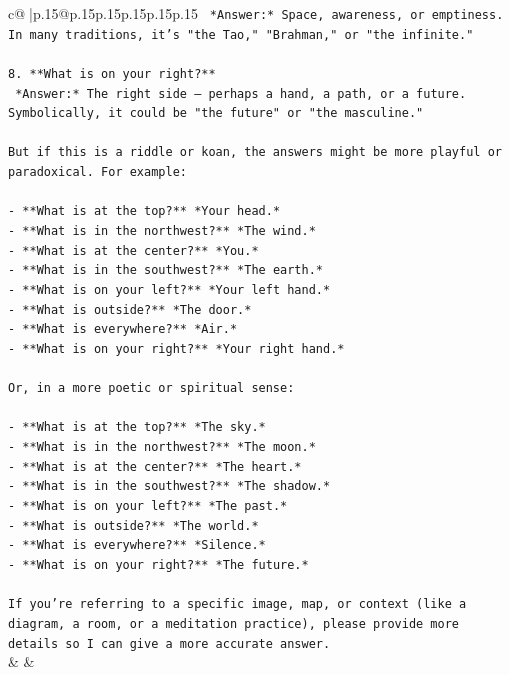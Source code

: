 \documentclass{article}
\begin{document}
{\begin{supertabular}{c@{$\;$}|p{.15\linewidth}@{}p{.15\linewidth}p{.15\linewidth}p{.15\linewidth}p{.15\linewidth}p{.15\linewidth}}
{{{\texttt{   *Answer:* Space, awareness, or emptiness. In many traditions, it's "the Tao," "Brahman," or "the infinite."} \\
\\ 
\texttt{8. **What is on your right?**  } \\
\texttt{   *Answer:* The right side — perhaps a hand, a path, or a future. Symbolically, it could be "the future" or "the masculine."} \\
\\ 
\texttt{But if this is a riddle or koan, the answers might be more playful or paradoxical. For example:} \\
\\ 
\texttt{{-} **What is at the top?** *Your head.*  } \\
\texttt{{-} **What is in the northwest?** *The wind.*  } \\
\texttt{{-} **What is at the center?** *You.*  } \\
\texttt{{-} **What is in the southwest?** *The earth.*  } \\
\texttt{{-} **What is on your left?** *Your left hand.*  } \\
\texttt{{-} **What is outside?** *The door.*  } \\
\texttt{{-} **What is everywhere?** *Air.*  } \\
\texttt{{-} **What is on your right?** *Your right hand.*} \\
\\ 
\texttt{Or, in a more poetic or spiritual sense:} \\
\\ 
\texttt{{-} **What is at the top?** *The sky.*  } \\
\texttt{{-} **What is in the northwest?** *The moon.*  } \\
\texttt{{-} **What is at the center?** *The heart.*  } \\
\texttt{{-} **What is in the southwest?** *The shadow.*  } \\
\texttt{{-} **What is on your left?** *The past.*  } \\
\texttt{{-} **What is outside?** *The world.*  } \\
\texttt{{-} **What is everywhere?** *Silence.*  } \\
\texttt{{-} **What is on your right?** *The future.*} \\
\\ 
\texttt{If you're referring to a specific image, map, or context (like a diagram, a room, or a meditation practice), please provide more details so I can give a more accurate answer.} \\
            }
        }
    }
    & & \\ \\


\end{supertabular}}
\end{document}
